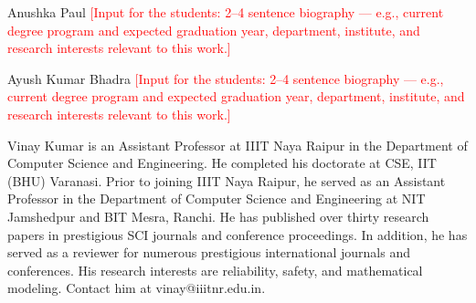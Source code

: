 \documentclass[journal]{IEEEtran}
\begin{document}
\begin{IEEEbiographynophoto}{Anushka Paul}
\textcolor{red}{[Input for the students: 2--4 sentence biography --- e.g., current degree program and expected graduation year, department, institute, and research interests relevant to this work.]}
\end{IEEEbiographynophoto}

\begin{IEEEbiographynophoto}{Ayush Kumar Bhadra}
\textcolor{red}{[Input for the students: 2--4 sentence biography --- e.g., current degree program and expected graduation year, department, institute, and research interests relevant to this work.]}
\end{IEEEbiographynophoto}

\begin{IEEEbiographynophoto}{Vinay Kumar}
is an Assistant Professor at IIIT Naya Raipur in the Department of Computer Science and Engineering.  He completed his doctorate at CSE, IIT (BHU) Varanasi. Prior to joining IIIT Naya Raipur, he served as an Assistant Professor in the Department of Computer Science and Engineering at NIT Jamshedpur and BIT Mesra, Ranchi. He has published over thirty research papers in prestigious SCI journals and conference proceedings. In addition, he has served as a reviewer for numerous prestigious international journals and conferences. His research interests are reliability, safety, and mathematical modeling. Contact him at vinay@iiitnr.edu.in.
\end{IEEEbiographynophoto}
\end{document}
